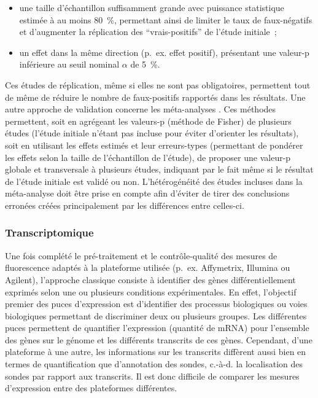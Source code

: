 \documentclass[11pt,a4paper,notrimn]{krantz}
\theoremstyle{definition}
\theoremstyle{definition}
\theoremstyle{remark}
\begin{document}
\begin{itemize}
\item
  une taille d'échantillon suffisamment grande avec puissance
  statistique estimée à au moins 80~\%, permettant ainsi de limiter le
  taux de faux-négatifs et d'augmenter la réplication des
  ``vrais-positifs'' de l'étude initiale~;
\item
  un effet dans la même direction (p.~ex. effet positif), présentant une
  valeur-p inférieure au seuil nominal \(\alpha\) de 5~\%.
\end{itemize}

Ces études de réplication, même si elles ne sont pas obligatoires,
permettent tout de même de réduire le nombre de faux-positifs rapportés
dans les résultats. Une autre approche de validation concerne les
méta-analyses
\citep{zeggini_meta-analysis_2009, evangelou_meta-analysis_2013}. Ces
méthodes permettent, soit en agrégeant les valeurs-p (méthode de Fisher)
de plusieurs études (l'étude initiale n'étant pas incluse pour éviter
d'orienter les résultats), soit en utilisant les effets estimés et leur
erreurs-types (permettant de pondérer les effets selon la taille de
l'échantillon de l'étude), de proposer une valeur-p globale et
transversale à plusieurs études, indiquant par le fait même si le
résultat de l'étude initiale est validé ou non. L'hétérogénéité des
études incluses dans la méta-analyse doit être prise en compte afin
d'éviter de tirer des conclusions erronées créées principalement par les
différences entre celles-ci.

\subsubsection{Transcriptomique}\label{transcriptomique}

Une fois complété le pré-traitement et le contrôle-qualité des mesures
de fluorescence adaptés à la plateforme utilisée (p.~ex. Affymetrix,
Illumina ou Agilent), l'approche classique consiste à identifier des
gènes différentiellement exprimés selon une ou plusieurs conditions
expérimentales. En effet, l'objectif premier des puces d'expression est
d'identifier des processus biologiques ou voies biologiques permettant
de discriminer deux ou plusieurs groupes. Les différentes puces
permettent de quantifier l'expression (quantité de mRNA) pour l'ensemble
des gènes sur le génome et les différents transcrits de ces gènes.
Cependant, d'une plateforme à une autre, les informations sur les
transcrits diffèrent aussi bien en termes de quantification que
d'annotation des sondes, c.-à-d. la localisation des sondes par rapport
aux transcrits. Il est donc difficile de comparer les mesures
d'expression entre des plateformes différentes.
\end{document}
